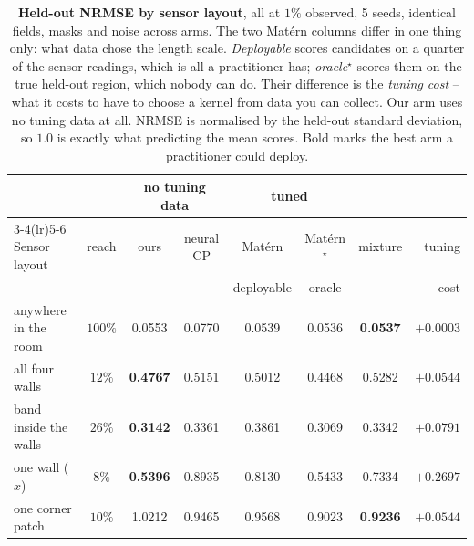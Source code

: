 \begin{table}[t]
  \centering
  \caption{\textbf{Held-out NRMSE by sensor layout}, all at $1\%$ observed, 5 seeds, identical fields, masks and noise across arms.  The two Mat\'ern columns differ in one thing only: what data chose the length scale.  \emph{Deployable} scores candidates on a quarter of the sensor readings, which is all a practitioner has; \emph{oracle}$^\star$ scores them on the true held-out region, which nobody can do.  Their difference is the \emph{tuning cost} -- what it costs to have to choose a kernel from data you can collect.  Our arm uses no tuning data at all.  NRMSE is normalised by the held-out standard deviation, so $1.0$ is exactly what predicting the mean scores.  Bold marks the best arm a practitioner could deploy.}
  \label{tab:layouts}
  \small
  \begin{tabular}{lccccccr}
    \toprule
    & & \multicolumn{2}{c}{no tuning data} & \multicolumn{2}{c}{tuned} & & \\
    \cmidrule(lr){3-4}\cmidrule(lr){5-6}
    Sensor layout & reach & ours & neural CP & Mat\'ern & Mat\'ern$^\star$ & mixture & tuning \\
    & & & & deployable & oracle & & cost \\
    \midrule
    anywhere in the room & $100\%$ & 0.0553 & 0.0770 & 0.0539 & 0.0536 & \textbf{0.0537} & $+0.0003$ \\
    all four walls & $12\%$ & \textbf{0.4767} & 0.5151 & 0.5012 & 0.4468 & 0.5282 & $+0.0544$ \\
    band inside the walls & $26\%$ & \textbf{0.3142} & 0.3361 & 0.3861 & 0.3069 & 0.3342 & $+0.0791$ \\
    one wall ($x$) & $8\%$ & \textbf{0.5396} & 0.8935 & 0.8130 & 0.5433 & 0.7334 & $+0.2697$ \\
    one corner patch & $10\%$ & 1.0212 & 0.9465 & 0.9568 & 0.9023 & \textbf{0.9236} & $+0.0544$ \\
    \bottomrule
  \end{tabular}
\end{table}

